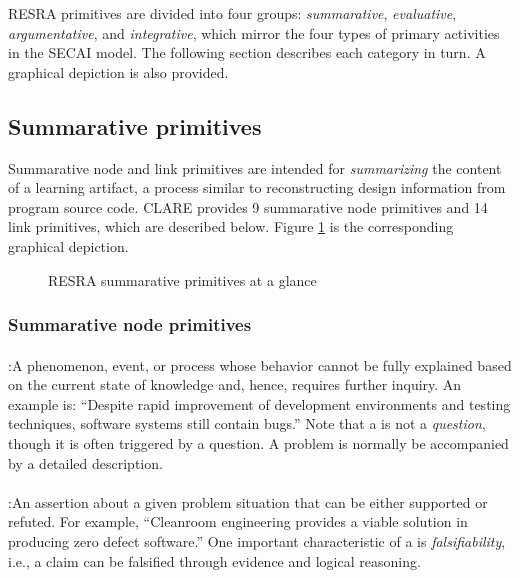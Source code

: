 RESRA primitives are divided into four groups: {\it summarative\/}, {\it
evaluative\/}, {\it argumentative\/}, and {\it integrative\/}, which mirror
the four types of primary activities in the SECAI model. The following
section describes each category in turn. A graphical depiction is also
provided.


\subsection{Summarative primitives}
\label{sec:summarative primitives}

Summarative node and link primitives are intended for {\it summarizing\/}
the content of a learning artifact, a process similar to reconstructing
design information from program source code. CLARE provides 9 summarative
node primitives and 14 link primitives, which are described below. Figure
\ref{fig:sum-resra} is the corresponding graphical depiction.

\begin{figure}[htb]
  \caption{RESRA summarative primitives at a glance}
  \label{fig:sum-resra}
\end{figure}


\subsubsection{Summarative node primitives}

\paragraph{}

\noindent{}:\hspace{.2in}A phenomenon, event, or process
whose behavior cannot be fully explained based on the current state of
knowledge and, hence, requires further inquiry. An example  is: ``Despite rapid improvement of development environments
and testing techniques, software systems still contain bugs.''  Note that a
 is not a {\it question\/}, though it is often
triggered by a question. A problem is normally be accompanied by a detailed
description.

\paragraph{}

\noindent{}:\hspace{.2in}An assertion about a given problem
situation that can be either supported or refuted. For example, ``Cleanroom
engineering provides a viable solution in producing zero defect software.''
One important characteristic of a  is {\it
falsifiability\/}, i.e., a claim can be falsified through evidence and
logical reasoning.

